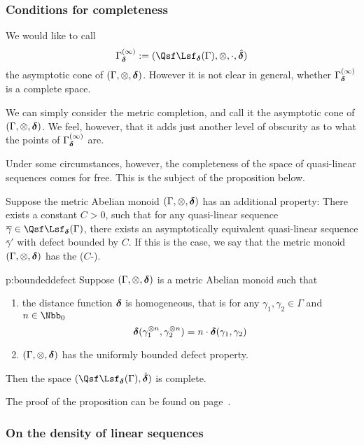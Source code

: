 \subsubsection{Conditions for completeness}
  We would like to call
  \[
  \Gamma^{(\infty)}_{\dist}
  :=
  (\qlin_{\dist}(\Gamma),\otimes,\cdot,\dista)
  \]    
  the asymptotic cone of $(\Gamma,\otimes,\operatorname{{\bm\delta}})$. However it is not
  clear in general, whether $\Gamma^{(\infty)}_{\operatorname{{\bm\delta}}}$ is a complete
  space.
 
  We can simply consider the metric completion, and call it the asymptotic
  cone of $(\Gamma,\otimes,\operatorname{{\bm\delta}})$. We feel, however, that it adds
  just another level of obscurity as to what the points of
  $\Gamma^{(\infty)}_{\operatorname{{\bm\delta}}}$ are.

  Under some circumstances, however, the completeness of the space of
  quasi-linear sequences comes for free. This is the subject of the
  proposition below.

  Suppose the metric Abelian monoid $(\Gamma,\otimes,\operatorname{{\bm\delta}})$ has an
  additional property: There exists a constant $C>0$, such that for
  any quasi-linear sequence $\bar\gamma\in\qlin_{\dist}(\Gamma)$,
  there exists an asymptotically equivalent quasi-linear sequence
  $\bar\gamma'$ with defect bounded by $C$.  If this is the case, we
  say that the metric monoid $(\Gamma,\otimes,\operatorname{{\bm\delta}})$ has the
  ($C$-).
    

  \begin{proposition}{p:boundeddefect}
    Suppose $(\Gamma,\otimes,\operatorname{{\bm\delta}})$ is a metric Abelian monoid such that 
    \begin{enumerate}
    \item
      \label{pi:homogeneity} 
      the distance function $\operatorname{{\bm\delta}}$ is homogeneous, that is
      for any $\gamma_{1},\gamma_{2}\in\Gamma$ and $n\in\Nbb_{0}$ 
      \[
      \operatorname{{\bm\delta}}(\gamma_{1}^{\otimes n},\gamma_{2}^{\otimes n})
      =
      n\cdot\operatorname{{\bm\delta}}(\gamma_{1},\gamma_{2})
      \]
    \item
      \label{pi:boundeddefect} 
      $(\Gamma,\otimes,\operatorname{{\bm\delta}})$ has the uniformly bounded defect property.
    \end{enumerate}
    Then the space $(\qlin_{\dist}(\Gamma),\dista)$ is complete.
  \end{proposition}
  The proof of the proposition can be found on
  page~\pageref{p:boundeddefect.rep}.

\subsubsection{On the density of linear sequences}


